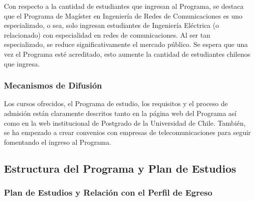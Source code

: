 Con respecto a la cantidad de estudiantes que ingresan al Programa, se destaca que el Programa de Magíster en Ingeniería de Redes de Comunicaciones 
es uno especializado, o sea, solo ingresan estudiantes de Ingeniería Eléctrica (o relacionado) con especialidad en redes
de comunicaciones. Al ser tan especializado, se reduce significativamente el mercado público. Se espera que 
una vez el Programa esté acreditado, esto aumente la cantidad de estudiantes chilenos que ingresa.




\subsubsection{Mecanismos de Difusión}

Los cursos ofrecidos, el Programa de estudio, los requisitos y el proceso de admisión están
claramente descritos tanto en la página web del Programa así como en la web institucional de
Postgrado de la Universidad de Chile. También, se ha empezado a crear convenios con empresas de
telecomunicaciones para seguir fomentando el ingreso al Programa. %

\subsection{Estructura del Programa y Plan de Estudios}
\label{estructura_plan}

\subsubsection{Plan de Estudios y Relación con el Perfil de Egreso}
\label{plan_estudios}

